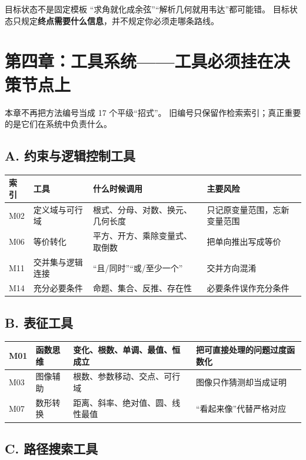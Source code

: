 \documentclass[11pt,a4paper]{ctexart}
\begin{document}
\begin{warningbox}{目标状态不是固定模板}
“求角就化成余弦”“解析几何就用韦达”都可能错。
目标状态只规定\textbf{终点需要什么信息}，并不规定你必须走哪条路线。
\end{warningbox}

\section{第四章：工具系统——工具必须挂在决策节点上}

本章不再把方法编号当成 17 个平级“招式”。
旧编号只保留作检索索引；真正重要的是它们在系统中负责什么。

\subsection{A. 约束与逻辑控制工具}

\begin{longtable}{p{2cm}p{3.3cm}p{5.3cm}p{4.8cm}}
\toprule
\textbf{索引} & \textbf{工具} & \textbf{什么时候调用} & \textbf{主要风险}\\
\midrule
M02 & 定义域与可行域 & 根式、分母、对数、换元、几何长度 & 只记原变量范围，忘新变量范围\\ \hline
M06 & 等价转化 & 平方、开方、乘除变量式、取倒数 & 把单向推出写成等价\\ \hline
M11 & 交并集与逻辑连接 & “且/同时”“或/至少一个” & 交并方向混淆\\ \hline
M14 & 充分必要条件 & 命题、集合、反推、存在性 & 必要条件误作充分条件\\
\bottomrule
\end{longtable}

\subsection{B. 表征工具}

\begin{longtable}{p{2cm}p{3.3cm}p{5.3cm}p{4.8cm}}
\toprule
M01 & 函数思维 & 变化、根数、单调、最值、恒成立 & 把可直接处理的问题过度函数化\\ \hline
M03 & 图像辅助 & 根数、参数移动、交点、可行域 & 图像只作猜测却当成证明\\ \hline
M07 & 数形转换 & 距离、斜率、绝对值、圆、线性最值 & “看起来像”代替严格对应\\
\bottomrule
\end{longtable}

\subsection{C. 路径搜索工具}
\end{document}
